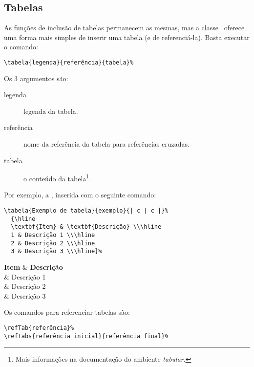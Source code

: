 %


\subsection{Tabelas}
As funções de inclusão de tabelas permanecem as mesmas, mas a classe \unbcic\ 
oferece uma forma mais simples de inserir uma tabela (e de referenciá-la). Basta 
executar o comando:

\begin{verbatim}
\tabela{legenda}{referência}{tabela}%
\end{verbatim}

Os 3 argumentos são:
\begin{description}
\item[legenda] legenda da tabela.
\item[referência] nome da referência da tabela para referências cruzadas.
\item[tabela] o conteúdo da tabela\footnote{Mais informações na documentação do 
ambiente \emph{tabular}.}.
\end{description} 

Por exemplo, a , inserida com o seguinte comando:
\begin{verbatim}
\tabela{Exemplo de tabela}{exemplo}{| c | c |}%
  {\hline
  \textbf{Item} & \textbf{Descrição} \\\hline
  1 & Descrição 1 \\\hline
  2 & Descrição 2 \\\hline
  3 & Descrição 3 \\\hline}%
\end{verbatim}

%
  {\hline
  \textbf{Item} & \textbf{Descrição} \\ & Descrição 1 \\ & Descrição 2 \\ & Descrição 3 \\\hline}%

Os comandos para referenciar tabelas são:

\begin{verbatim}
\refTab{referência}%
\refTabs{referência inicial}{referência final}%
\end{verbatim}

